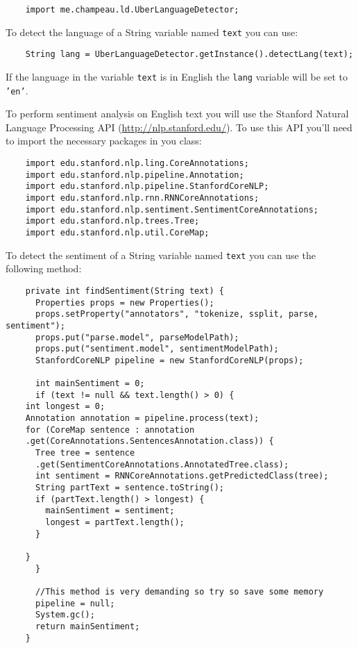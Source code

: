 \documentclass[a4paper,10pt]{article}
\begin{document}
  \lstset{language=Java}  
  \begin{lstlisting}
    import me.champeau.ld.UberLanguageDetector;
  \end{lstlisting}
  
  To detect the language of a String variable named \texttt{text} you can use: 
  
  \begin{lstlisting}
    String lang = UberLanguageDetector.getInstance().detectLang(text);
  \end{lstlisting}
  
  If the language in the variable \texttt{text} is in English the \texttt{lang} variable will be set to \texttt{'en'}. 
  
  To perform sentiment analysis on English text you will use the Stanford Natural Language Processing API (\url{http://nlp.stanford.edu/}). To use this API you'll need to import the necessary packages in you class: 
  
  \begin{lstlisting}
    import edu.stanford.nlp.ling.CoreAnnotations;
    import edu.stanford.nlp.pipeline.Annotation;
    import edu.stanford.nlp.pipeline.StanfordCoreNLP;
    import edu.stanford.nlp.rnn.RNNCoreAnnotations;
    import edu.stanford.nlp.sentiment.SentimentCoreAnnotations;
    import edu.stanford.nlp.trees.Tree;
    import edu.stanford.nlp.util.CoreMap;
  \end{lstlisting}
  
  To detect the sentiment of a String variable named \texttt{text} you can use the following method:
  \begin{lstlisting}
    private int findSentiment(String text) {
      Properties props = new Properties();
      props.setProperty("annotators", "tokenize, ssplit, parse, sentiment");
      props.put("parse.model", parseModelPath);
      props.put("sentiment.model", sentimentModelPath);
      StanfordCoreNLP pipeline = new StanfordCoreNLP(props);
      
      int mainSentiment = 0;
      if (text != null && text.length() > 0) {
	int longest = 0;
	Annotation annotation = pipeline.process(text);
	for (CoreMap sentence : annotation
	.get(CoreAnnotations.SentencesAnnotation.class)) {
	  Tree tree = sentence
	  .get(SentimentCoreAnnotations.AnnotatedTree.class);
	  int sentiment = RNNCoreAnnotations.getPredictedClass(tree);
	  String partText = sentence.toString();
	  if (partText.length() > longest) {
	    mainSentiment = sentiment;
	    longest = partText.length();
	  }
	  
	}
      }
      
      //This method is very demanding so try so save some memory 
      pipeline = null;
      System.gc();
      return mainSentiment;
    }
  \end{lstlisting}
  
\end{document}
